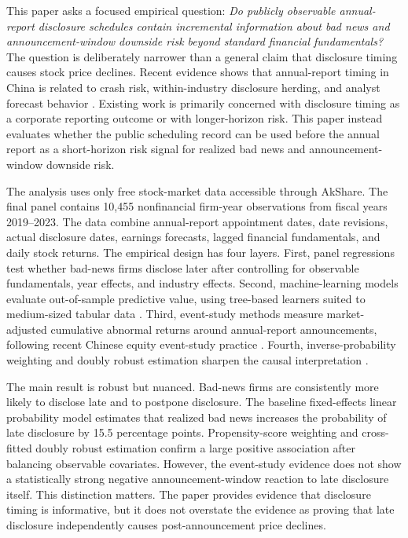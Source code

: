 \documentclass[10pt]{article}
\begin{document}
This paper asks a focused empirical question: \emph{Do publicly observable annual-report disclosure schedules contain incremental information about bad news and announcement-window downside risk beyond standard financial fundamentals?} The question is deliberately narrower than a general claim that disclosure timing causes stock price declines. Recent evidence shows that annual-report timing in China is related to crash risk, within-industry disclosure herding, and analyst forecast behavior \cite{Li2020,Cao2021,TangBae2021}. Existing work is primarily concerned with disclosure timing as a corporate reporting outcome or with longer-horizon risk. This paper instead evaluates whether the public scheduling record can be used before the annual report as a short-horizon risk signal for realized bad news and announcement-window downside risk.

The analysis uses only free stock-market data accessible through AkShare. The final panel contains 10,455 nonfinancial firm-year observations from fiscal years 2019--2023. The data combine annual-report appointment dates, date revisions, actual disclosure dates, earnings forecasts, lagged financial fundamentals, and daily stock returns. The empirical design has four layers. First, panel regressions test whether bad-news firms disclose later after controlling for observable fundamentals, year effects, and industry effects. Second, machine-learning models evaluate out-of-sample predictive value, using tree-based learners suited to medium-sized tabular data \cite{Grinsztajn2022}. Third, event-study methods measure market-adjusted cumulative abnormal returns around annual-report announcements, following recent Chinese equity event-study practice \cite{LiFangCao2024}. Fourth, inverse-probability weighting and doubly robust estimation sharpen the causal interpretation \cite{Kurz2022}.

The main result is robust but nuanced. Bad-news firms are consistently more likely to disclose late and to postpone disclosure. The baseline fixed-effects linear probability model estimates that realized bad news increases the probability of late disclosure by 15.5 percentage points. Propensity-score weighting and cross-fitted doubly robust estimation confirm a large positive association after balancing observable covariates. However, the event-study evidence does not show a statistically strong negative announcement-window reaction to late disclosure itself. This distinction matters. The paper provides evidence that disclosure timing is informative, but it does not overstate the evidence as proving that late disclosure independently causes post-announcement price declines.
\end{document}
